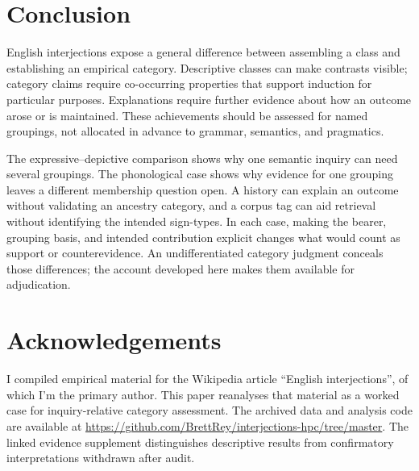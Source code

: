\section{Conclusion}\label{sec:conclusion}

English interjections expose a general difference between assembling a
class and establishing an empirical category. Descriptive classes can
make contrasts visible; category claims require co-occurring properties
that support induction for particular purposes. Explanations require
further evidence about how an outcome arose or is maintained. These
achievements should be assessed for named groupings, not allocated in
advance to grammar, semantics, and pragmatics.

The expressive--depictive comparison shows why one semantic inquiry can
need several groupings. The phonological case shows why evidence for
one grouping leaves a different membership question open. A history
can explain an outcome without validating an ancestry category, and a
corpus tag can aid retrieval without identifying the intended sign-types.
In each case, making the bearer, grouping basis, and intended contribution
explicit changes what would count as support or counterevidence.
An undifferentiated category judgment conceals those differences; the
account developed here makes them available for adjudication.

\ifblind\else
\section*{Acknowledgements}

I compiled empirical material for the Wikipedia article \enquote{English
interjections}, of which I'm the primary author. This paper reanalyses
that material as a worked case for inquiry-relative category assessment.
The archived data and analysis code are available at
\url{https://github.com/BrettRey/interjections-hpc/tree/master}.
The linked evidence supplement distinguishes descriptive results from
confirmatory interpretations withdrawn after audit.
\fi

\clearpage
\begingroup
\setlength{\emergencystretch}{3em}
\printbibliography
\endgroup


